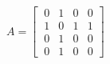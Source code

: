 \documentclass[preview]{standalone}
\begin{document}
\begin{center}
$A=\begin{bmatrix}\
                      0 & 1 & 0 & 0\\\
                      1 & 0 & 1 & 1\\\
                      0 & 1 & 0 & 0\\\
                      0 & 1 & 0 & 0\end{bmatrix}$
\end{center}
\end{document}

